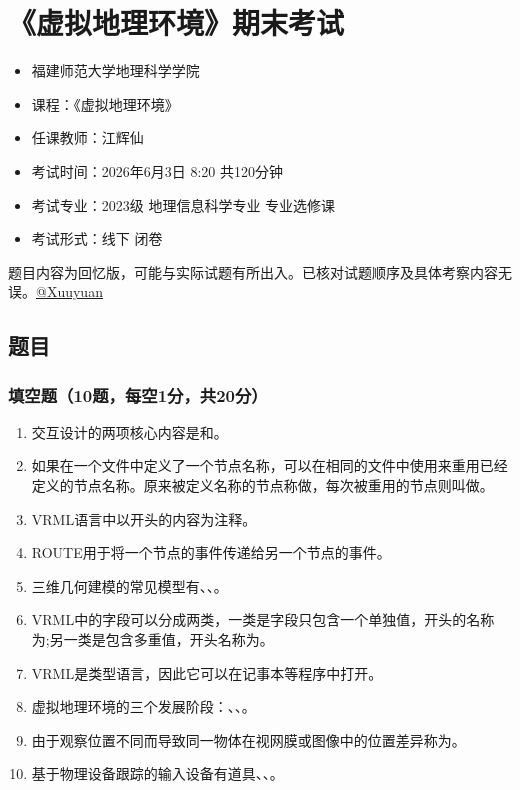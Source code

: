 \documentclass[
  11pt,
]{ctexart}
\author{}
\date{}
\providecommand{\tightlist}{%
  \setlength{\itemsep}{0pt}\setlength{\parskip}{0pt}}
\newcommand{\blank}{\underline{\hspace{2.8em}}}
\begin{document}
\section{《虚拟地理环境》期末考试}\label{ux865aux62dfux5730ux7406ux73afux5883ux671fux672bux8003ux8bd5}

\begin{itemize}
\tightlist
\item
  福建师范大学地理科学学院
\item
  课程：《虚拟地理环境》
\item
  任课教师：江辉仙
\item
  考试时间：2026年6月3日 8:20 共120分钟
\item
  考试专业：2023级 地理信息科学专业 专业选修课
\item
  考试形式：线下 闭卷
\end{itemize}

题目内容为回忆版，可能与实际试题有所出入。已核对试题顺序及具体考察内容无误。\href{https://github.com/Xuuyuan}{@Xuuyuan}

\subsection{题目}\label{ux9898ux76ee}

\subsubsection{填空题（10题，每空1分，共20分）}\label{ux586bux7a7aux989810ux9898ux6bcfux7a7a1ux5206ux517120ux5206}

\begin{enumerate}
\def\labelenumi{\arabic{enumi}.}
\tightlist
\item
  交互设计的两项核心内容是\blank{}和\blank{}。
\item
  如果在一个文件中定义了一个节点名称，可以在相同的文件中使用\blank{}来重用已经定义的节点名称。原来被定义名称的节点称做\blank{}，每次被重用的节点则叫做\blank{}。
\item
  VRML语言中以\blank{}开头的内容为注释。
\item
  ROUTE用于将一个节点的\blank{}事件传递给另一个节点的\blank{}事件。
\item
  三维几何建模的常见模型有\blank{}、\blank{}、\blank{}。
\item
  VRML中的字段可以分成两类，一类是字段只包含一个单独值，开头的名称为\blank{};另一类是包含多重值，开头名称为\blank{}。
\item
  VRML是\blank{}类型语言，因此它可以在记事本等程序中打开。
\item
  虚拟地理环境的三个发展阶段：\blank{}、\blank{}、\blank{}。
\item
  由于观察位置不同而导致同一物体在视网膜或图像中的位置差异称为\blank{}。
\item
  基于物理设备跟踪的输入设备有道具、\blank{}、\blank{}。
\end{enumerate}
\end{document}
